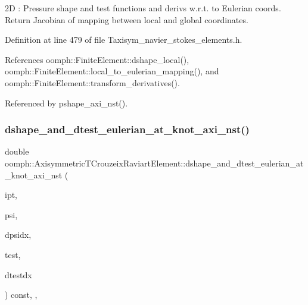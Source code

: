 2D \+: Pressure shape and test functions and derivs w.\+r.\+t. to Eulerian coords. Return Jacobian of mapping between local and global coordinates. 

Definition at line 479 of file Taxisym\+\_\+navier\+\_\+stokes\+\_\+elements.\+h.



References oomph\+::\+Finite\+Element\+::dshape\+\_\+local(), oomph\+::\+Finite\+Element\+::local\+\_\+to\+\_\+eulerian\+\_\+mapping(), and oomph\+::\+Finite\+Element\+::transform\+\_\+derivatives().



Referenced by pshape\+\_\+axi\+\_\+nst().

\mbox{\label{classoomph_1_1AxisymmetricTCrouzeixRaviartElement_a7744f0666fd5005b65300843281efe81}} 
\subsubsection{\texorpdfstring{dshape\+\_\+and\+\_\+dtest\+\_\+eulerian\+\_\+at\+\_\+knot\+\_\+axi\+\_\+nst()}{dshape\_and\_dtest\_eulerian\_at\_knot\_axi\_nst()}\hspace{0.1cm}{\footnotesize\ttfamily [1/2]}}
{\footnotesize\ttfamily double oomph\+::\+Axisymmetric\+T\+Crouzeix\+Raviart\+Element\+::dshape\+\_\+and\+\_\+dtest\+\_\+eulerian\+\_\+at\+\_\+knot\+\_\+axi\+\_\+nst (\begin{DoxyParamCaption}\item[{const unsigned \&}]{ipt,  }\item[{\hyperlink{classoomph_1_1Shape}{Shape} \&}]{psi,  }\item[{\hyperlink{classoomph_1_1DShape}{D\+Shape} \&}]{dpsidx,  }\item[{\hyperlink{classoomph_1_1Shape}{Shape} \&}]{test,  }\item[{\hyperlink{classoomph_1_1DShape}{D\+Shape} \&}]{dtestdx }\end{DoxyParamCaption}) const\hspace{0.3cm}{\ttfamily [inline]}, {\ttfamily [protected]}, {\ttfamily [virtual]}}



